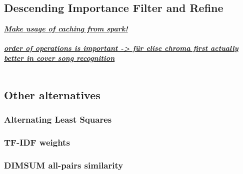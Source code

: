 \subsection{Descending Importance Filter and Refine}

\textit{\textbf{\underline{Make usage of caching from spark!}\\}}
\ \\

\textit{\textbf{\underline{order of operations is important -> für elise chroma first actually better in cover song recognition}\\}}
\ \\

\subsection{Other alternatives}

\subsubsection{Alternating Least Squares}

\subsubsection{TF-IDF weights}

\subsubsection{DIMSUM all-pairs similarity}